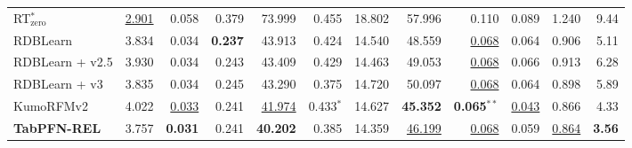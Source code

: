 \begin{table}[H]
{\begin{tabular}{lrrrrrrrrrrr}
RT$_{\text{zero}}^{*}$ & \underline{2.901} & 0.058 & 0.379 & 73.999 & 0.455 & 18.802 & 57.996 & 0.110 & 0.089 & 1.240 & 9.44 \\
RDBLearn & 3.834 & 0.034 & \textbf{0.237} & 43.913 & 0.424 & 14.540 & 48.559 & \underline{0.068} & 0.064 & 0.906 & 5.11 \\
\addlinespace[3pt]
RDBLearn + v2.5 & 3.930 & 0.034 & 0.243 & 43.409 & 0.429 & 14.463 & 49.053 & \underline{0.068} & 0.066 & 0.913 & 6.28 \\
RDBLearn + v3 & 3.835 & 0.034 & 0.245 & 43.290 & 0.375 & 14.720 & 50.097 & \underline{0.068} & 0.064 & 0.898 & 5.89 \\
\addlinespace[3pt]
KumoRFMv2 & 4.022 & \underline{0.033} & 0.241 & \underline{41.974} & 0.433$^{*}$ & 14.627 & \textbf{45.352} & \textbf{0.065$^{**}$} & \underline{0.043} & 0.866 & 4.33 \\
\addlinespace[3pt]
\textbf{TabPFN-REL} & 3.757 & \textbf{0.031} & 0.241 & \textbf{40.202} & 0.385 & 14.359 & \underline{46.199} & \underline{0.068} & 0.059 & \underline{0.864} & \textbf{3.56} \\
\bottomrule
\end{tabular}}
\end{table}


